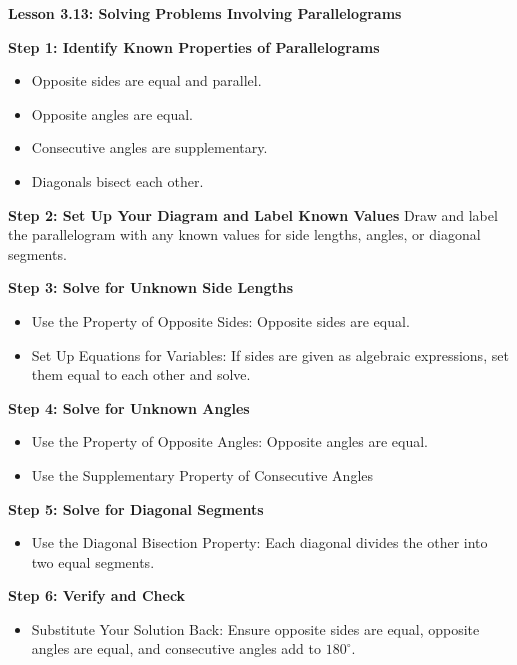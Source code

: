 \begin{center}
\textbf{Lesson 3.13: Solving Problems Involving Parallelograms}
\end{center}

\vspace*{-1.5ex}

\textbf{Step 1: Identify Known Properties of Parallelograms}
\begin{itemize}
    \item Opposite sides are equal and parallel.
    \item Opposite angles are equal.
    \item Consecutive angles are supplementary.
    \item Diagonals bisect each other.
\end{itemize}

\textbf{Step 2: Set Up Your Diagram and Label Known Values}
Draw and label the parallelogram with any known values for side lengths, angles, or diagonal segments.

\textbf{Step 3: Solve for Unknown Side Lengths}
\begin{itemize}
    \item Use the Property of Opposite Sides: Opposite sides are equal.
   
    \item Set Up Equations for Variables: If sides are given as algebraic expressions, set them equal to each other and solve.
\end{itemize}

\textbf{Step 4: Solve for Unknown Angles}
\begin{itemize}
    \item Use the Property of Opposite Angles: Opposite angles are equal.
    
    \item Use the Supplementary Property of Consecutive Angles

\end{itemize}

\textbf{Step 5: Solve for Diagonal Segments}
\begin{itemize}
    \item Use the Diagonal Bisection Property: Each diagonal divides the other into two equal segments.
\end{itemize}

\textbf{Step 6: Verify and Check}
\begin{itemize}
    \item Substitute Your Solution Back: Ensure opposite sides are equal, opposite angles are equal, and consecutive angles add to \(180^\circ\).
\end{itemize}
